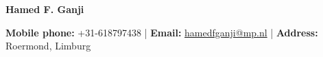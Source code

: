 \documentclass[a4paper,11pt]{article}
\newcommand{\socialicon}[1]{\raisebox{-0.05em}{\resizebox{!}{1em}{#1}}}
\newcommand{\headerfontiii}{\fontfamily{ppl}\selectfont} %
\begin{document}
\headerfontiii

\begin{center}
    {\huge\textbf{Hamed F. Ganji}}
\end{center}

\begin{center}
\small{
    \textbf{Mobile phone:} +31-618797438 | \textbf{Email:} \href{mailto:hamedfganji@mp.nl}{hamedfganji@mp.nl} | 
    \textbf{Address:} Roermond, Limburg}
\end{center}


\vspace{-6mm}

\end{document}
